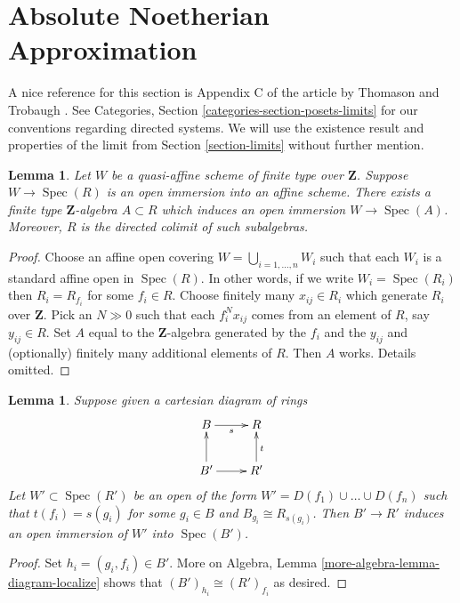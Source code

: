 \documentclass{stacks-project}
\theoremstyle{plain}
\newtheorem{lemma}[subsection]{Lemma}
\theoremstyle{definition}
\theoremstyle{remark}
\numberwithin{equation}{subsection}
\def\Spec{\mathop{\mathrm{Spec}}}
\begin{document}
\section{Absolute Noetherian Approximation}
\label{section-approximation}

\noindent
A nice reference for this section is Appendix C of the article
by Thomason and Trobaugh \cite{TT}.
See Categories, Section \ref{categories-section-posets-limits}
for our conventions regarding directed systems.
We will use the existence result and properties of the limit
from Section \ref{section-limits} without further mention.

\begin{lemma}
\label{lemma-quasi-affine-finite-type-over-Z}
Let $W$ be a quasi-affine scheme of finite type over
$\mathbf{Z}$. Suppose $W \to \Spec(R)$ is an
open immersion into an affine scheme. There exists a
finite type $\mathbf{Z}$-algebra $A \subset R$
which induces an open immersion $W \to \Spec(A)$.
Moreover, $R$ is the directed colimit of such subalgebras.
\end{lemma}

\begin{proof}
Choose an affine open covering $W = \bigcup_{i = 1, \ldots, n} W_i$
such that each $W_i$ is a standard affine open in $\Spec(R)$.
In other words, if we write $W_i = \Spec(R_i)$
then $R_i = R_{f_i}$ for some $f_i \in R$.
Choose finitely many $x_{ij} \in R_i$ which generate
$R_i$ over $\mathbf{Z}$.
Pick an $N \gg 0$ such that each $f_i^Nx_{ij}$ comes from an
element of $R$, say $y_{ij} \in R$.
Set $A$ equal to the $\mathbf{Z}$-algebra generated by
the $f_i$ and the $y_{ij}$ and (optionally) finitely many
additional elements of $R$. Then $A$ works. Details omitted.
\end{proof}

\begin{lemma}
\label{lemma-diagram}
Suppose given a cartesian diagram of rings
$$
\xymatrix{
B \ar[r]_s & R \\
B'\ar[u] \ar[r] & R' \ar[u]_t
}
$$
Let $W' \subset \Spec(R')$ be an open of
the form $W' = D(f_1) \cup \ldots \cup D(f_n)$
such that $t(f_i) = s(g_i)$ for some $g_i \in B$
and $B_{g_i} \cong R_{s(g_i)}$. Then $B' \to R'$
induces an open immersion of $W'$ into $\Spec(B')$.
\end{lemma}

\begin{proof}
Set $h_i = (g_i, f_i) \in B'$. More on Algebra,
Lemma \ref{more-algebra-lemma-diagram-localize} shows that
$(B')_{h_i} \cong (R')_{f_i}$ as desired.
\end{proof}
\end{document}
